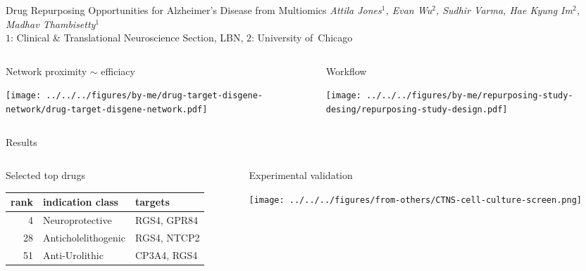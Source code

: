 \documentclass[aspectratio=169]{beamer}
\subtitle{A subtitle may be shorter and more technical}
\author{poster \#1}
\date{Attila Jones}
\begin{document}
\begin{frame}{Drug Repurposing Opportunities for Alzheimer’s Disease from
	Multiomics}
	{\emph{Attila Jones$^1$, Evan Wu$^2$, Sudhir Varma, Hae Kyung Im$^2$, Madhav Thambisetty$^1$}\\
		$1$: Clinical \& Translational Neuroscience Section, LBN, $2$: University
	of~Chicago}

\begin{columns}[t]
\begin{column}{0.35\textwidth}
\begin{center}
	Network proximity $\sim$
	efficiacy
\end{center}

\texttt{[image: ../../../figures/by-me/drug-target-disgene-network/drug-target-disgene-network.pdf]}
\end{column}

\begin{column}{0.7\textwidth}
\begin{center}
	Workflow
\end{center}

\texttt{[image: ../../../figures/by-me/repurposing-study-desing/repurposing-study-design.pdf]}
\end{column}
\end{columns}
\end{frame}

\begin{frame}{Results}
	

\begin{columns}[t]
\begin{column}{0.5\textwidth}
\begin{center}
	Selected top drugs
\end{center}
\footnotesize
\begin{tabular}{rll}
	rank & indication class    & targets \\
	\hline
	4    & Neuroprotective     & RGS4, GPR84 \\
	28   & Anticholelithogenic & RGS4, NTCP2 \\
	51   & Anti-Urolithic      & CP3A4, RGS4 \\
\end{tabular}
\end{column}

\begin{column}{0.5\textwidth}
\begin{center}
	Experimental validation\\
\end{center}

\texttt{[image: ../../../figures/from-others/CTNS-cell-culture-screen.png]}
\end{column}
\end{columns}
\end{frame}
\end{document}
